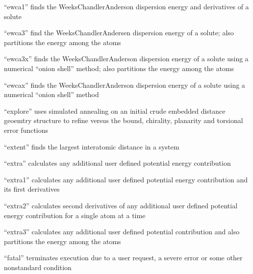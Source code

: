\documentclass[letterpaper,11pt,english]{sphinxmanual}
\begin{document}

“ewca1” finds the Weeks\sphinxhyphen{}Chandler\sphinxhyphen{}Anderson dispersion energy
and derivatives of a solute


“ewca3” find the Weeks\sphinxhyphen{}Chandler\sphinxhyphen{}Andersen dispersion energy
of a solute; also partitions the energy among the atoms


“ewca3x” finds the Weeks\sphinxhyphen{}Chandler\sphinxhyphen{}Anderson dispersion energy
of a solute using a numerical “onion shell” method; also
partitions the energy among the atoms


“ewcax” finds the Weeks\sphinxhyphen{}Chandler\sphinxhyphen{}Anderson dispersion energy
of a solute using a numerical “onion shell” method


“explore” uses simulated annealing on an initial crude
embedded distance geoemtry structure to refine versus the
bound, chirality, planarity and torsional error functions


“extent” finds the largest interatomic distance in a system


“extra” calculates any additional user defined potential
energy contribution


“extra1” calculates any additional user defined potential
energy contribution and its first derivatives


“extra2” calculates second derivatives of any additional
user defined potential energy contribution for a single
atom at a time


“extra3” calculates any additional user defined potential
contribution and also partitions the energy among the atoms


“fatal” terminates execution due to a user request, a severe
error or some other nonstandard condition
\end{document}
